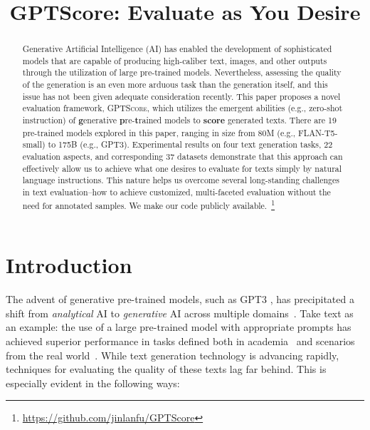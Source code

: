 \title{GPTScore: Evaluate as You Desire}

\begin{abstract}
Generative Artificial Intelligence (AI) has enabled the development of sophisticated models that are capable of producing high-caliber text, images, and other outputs through the utilization of large pre-trained models. Nevertheless, assessing the quality of the generation is an even more arduous task than the generation itself, and this issue has not been given adequate consideration recently. This paper proposes a novel evaluation framework, \textsc{GPTScore}, which utilizes the emergent abilities (e.g., zero-shot instruction) of \textbf{g}enerative \textbf{p}re-\textbf{t}rained models to \textbf{score} generated texts. There are 19 pre-trained models explored in this paper, ranging in size from 80M (e.g., FLAN-T5-small)  to 175B (e.g., GPT3). Experimental results on four text generation tasks,  $22$ evaluation aspects, and corresponding $37$ datasets demonstrate that this approach can effectively allow us to achieve what one desires to evaluate for texts simply by natural language instructions. This nature helps us overcome several long-standing challenges in text evaluation--how to achieve customized, multi-faceted evaluation without the need for annotated samples. We make our code publicly available.~\footnote{\url{https://github.com/jinlanfu/GPTScore}}
\end{abstract}

\section{Introduction}

The advent of generative pre-trained models, such as GPT3 \cite{tom:gpt3}, has precipitated a shift from \textit{analytical} AI to \textit{generative} AI across multiple domains~\cite{sequoia2022}. Take text as an example: the use of a large pre-trained model with appropriate prompts \cite{liu2021pre} has achieved superior performance in tasks defined both in academia~\cite{sanh2021multitask} and scenarios from the real world~\cite{ouyang2022training}. While text generation technology is advancing rapidly, techniques for evaluating the quality of these texts lag far behind. This is especially evident in the following ways:

